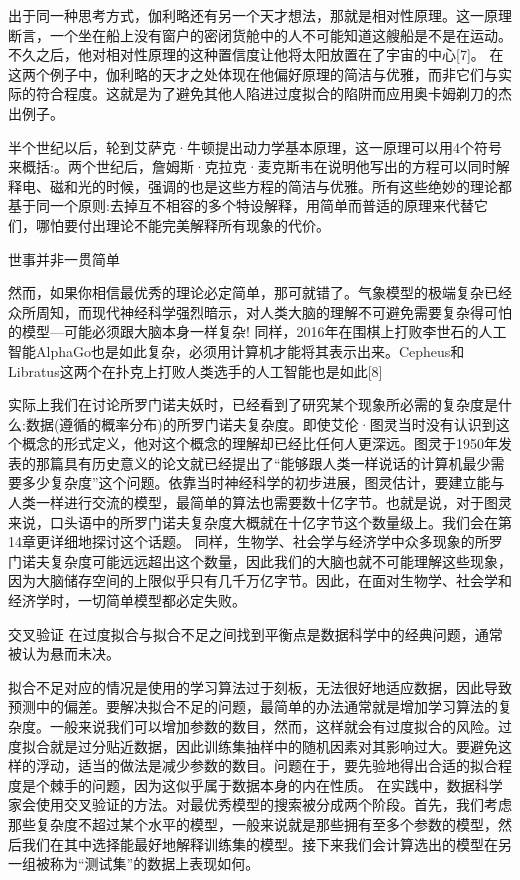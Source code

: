 出于同一种思考方式，伽利略还有另一个天才想法，那就是相对性原理。这一原理断言，一个坐在船上没有窗户的密闭货舱中的人不可能知道这艘船是不是在运动。
不久之后，他对相对性原理的这种置信度让他将太阳放置在了宇宙的中心[7]。
在这两个例子中，伽利略的天才之处体现在他偏好原理的简洁与优雅，而非它们与实际的符合程度。这就是为了避免其他人陷进过度拟合的陷阱而应用奥卡姆剃刀的杰出例子。

半个世纪以后，轮到艾萨克·牛顿提出动力学基本原理，这一原理可以用4个符号来概括:。两个世纪后，詹姆斯·克拉克·麦克斯韦在说明他写出的方程可以同时解释电、磁和光的时候，强调的也是这些方程的简洁与优雅。所有这些绝妙的理论都基于同一个原则:去掉互不相容的多个特设解释，用简单而普适的原理来代替它们，哪怕要付出理论不能完美解释所有现象的代价。



世事并非一贯简单

然而，如果你相信最优秀的理论必定简单，那可就错了。气象模型的极端复杂已经众所周知，而现代神经科学强烈暗示，对人类大脑的理解不可避免需要复杂得可怕的模型---可能必须跟大脑本身一样复杂!
同样，2016年在围棋上打败李世石的人工智能AlphaGo也是如此复杂，必须用计算机才能将其表示出来。Cepheus和Libratus这两个在扑克上打败人类选手的人工智能也是如此[8]

实际上我们在讨论所罗门诺夫妖时，已经看到了研究某个现象所必需的复杂度是什么:数据(遵循的概率分布)的所罗门诺夫复杂度。即使艾伦·图灵当时没有认识到这个概念的形式定义，他对这个概念的理解却已经比任何人更深远。图灵于1950年发表的那篇具有历史意义的论文就已经提出了“能够跟人类一样说话的计算机最少需要多少复杂度”这个问题。依靠当时神经科学的初步进展，图灵估计，要建立能与人类一样进行交流的模型，最简单的算法也需要数十亿字节。也就是说，对于图灵来说，口头语中的所罗门诺夫复杂度大概就在十亿字节这个数量级上。我们会在第14章更详细地探讨这个话题。
同样，生物学、社会学与经济学中众多现象的所罗门诺夫复杂度可能远远超出这个数量，因此我们的大脑也就不可能理解这些现象，因为大脑储存空间的上限似乎只有几千万亿字节。因此，在面对生物学、社会学和经济学时，一切简单模型都必定失败。

交叉验证
在过度拟合与拟合不足之间找到平衡点是数据科学中的经典问题，通常被认为悬而未决。

拟合不足对应的情况是使用的学习算法过于刻板，无法很好地适应数据，因此导致预测中的偏差。要解决拟合不足的问题，最简单的办法通常就是增加学习算法的复杂度。一般来说我们可以增加参数的数目，然而，这样就会有过度拟合的风险。过度拟合就是过分贴近数据，因此训练集抽样中的随机因素对其影响过大。要避免这样的浮动，适当的做法是减少参数的数目。问题在于，要先验地得出合适的拟合程度是个棘手的问题，因为这似乎属于数据本身的内在性质。
在实践中，数据科学家会使用交叉验证的方法。对最优秀模型的搜索被分成两个阶段。首先，我们考虑那些复杂度不超过某个水平的模型，一般来说就是那些拥有至多个参数的模型，然后我们在其中选择能最好地解释训练集的模型。接下来我们会计算选出的模型在另一组被称为“测试集”的数据上表现如何。

